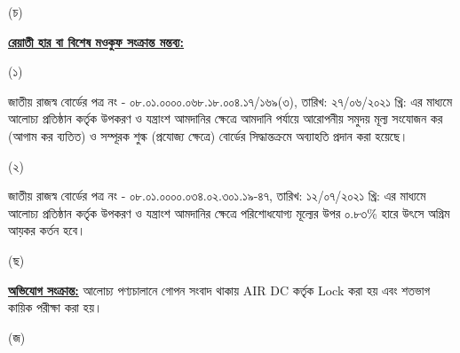 \documentclass[12pt]{article}
\newcommand{\nbrosnt}{জাতীয় রাজস্ব বোর্ডের পত্র নং - ০৮.০১.০০০০.০৬৮.১৮.০০৪.১৭/১৬৯(৩)}
\newcommand{\nbrosntd}{তারিখ: ২৭/০৬/২০২১ খ্রি:}
\newcommand{\nbrfs}{জাতীয় রাজস্ব বোর্ডের পত্র নং - ০৮.০১.০০০০.০৩৪.০২.৩০১.১৯-৪৭}
\newcommand{\nbrfsd}{তারিখ: ১২/০৭/২০২১ খ্রি:}
\begin{document}
\begin{minipage}[t]{0.05\linewidth}
(চ)
\end{minipage}
\begin{minipage}[t]{0.90\linewidth}
\underline{\textbf{রেয়াতী হার বা বিশেষ মওকুফ সংক্রান্ত মন্তব্য:}}
\end{minipage}
\begin{minipage}[t]{0.1\linewidth}
\hspace{1em}
\end{minipage}
\begin{minipage}[t]{0.05\linewidth}
(১)
\end{minipage}
\begin{minipage}[t]{0.85\linewidth}
{\nbrosnt}, {\nbrosntd} এর মাধ্যমে আলোচ্য
প্রতিষ্ঠান কর্তৃক উপকরণ ও যন্ত্রাংশ আমদানির ক্ষেত্রে
আমদানি পর্যায়ে আরোপনীয় সমুদয় মূল্য সংযোজন কর
(আগাম কর ব্যতিত) ও সম্পূরক শুল্ক (প্রযোজ্য ক্ষেত্রে) বোর্ডের
সিদ্ধান্তক্রমে অব্যাহতি প্রদান করা হয়েছে।
\end{minipage}
\begin{minipage}[t]{0.1\linewidth}
\hspace{1em}
\end{minipage}
\begin{minipage}[t]{0.05\linewidth}
(২)
\end{minipage}
\begin{minipage}[t]{0.85\linewidth}
{\nbrfs}, {\nbrfsd} এর মাধ্যমে আলোচ্য
প্রতিষ্ঠান কর্তৃক উপকরণ ও যন্ত্রাংশ আমদানির ক্ষেত্রে
পরিশোধযোগ্য মূল্যের উপর ০.৮৩\% হারে উৎসে অগ্রিম
আয়কর কর্তন হবে।
\\
\end{minipage}
\begin{minipage}[t]{0.05\linewidth}
\hspace{1em}
\end{minipage}
\begin{minipage}[t]{0.05\linewidth}
(ছ)
\end{minipage}
\begin{minipage}[t]{0.90\linewidth}
\underline{\textbf{অভিযোগ সংক্রান্ত:}} আলোচ্য পণ্যচালানে
গোপন সংবাদ থাকায় AIR DC কর্তৃক Lock করা হয় এবং শতভাগ কায়িক পরীক্ষা করা হয়।
\\
\end{minipage}
\begin{minipage}[t]{0.05\linewidth}
\hspace{1em}
\end{minipage}
\begin{minipage}[t]{0.05\linewidth}
(জ)
\end{minipage}
\end{document}
